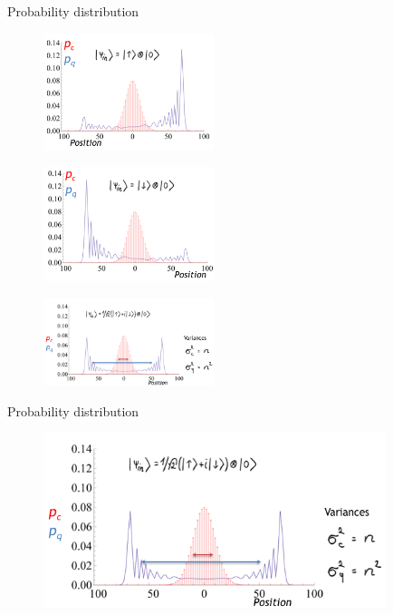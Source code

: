 \documentclass[xcolor=svgnames]{beamer}
\begin{document}
\begin{frame}{Probability distribution}
\begin{figure}[ht]
    \includegraphics[width = 5cm]{pdf_zero_intial_state.png}
\end{figure}
\begin{figure}[ht]
    \includegraphics[width = 5cm]{pdf_zero_state1.png}
\end{figure}
\begin{figure}[b]
    \includegraphics[width = 5cm]{pdf_symmetric.png}
\end{figure}
    
\end{frame}
\begin{frame}{Probability distribution}
\centering
\begin{figure}[htp]
    \includegraphics[width = 10cm]{pdf_symmetric.png}
\end{figure}
\end{frame}
\end{document}
